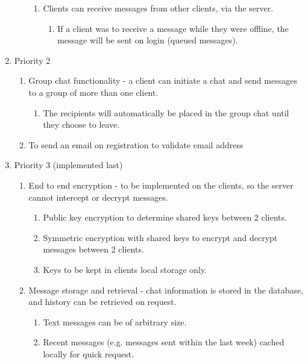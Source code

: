 \begin{enumerate}
\begin{enumerate}[label*=\arabic*.]
\begin{enumerate}[label*=\arabic*.]
\item Clients can receive messages from other clients, via the server. 
\begin{enumerate}[label*=\arabic*.]
\item If a client was to receive a message while they were offline, the message will be sent on login (queued messages).
\end{enumerate}
\end{enumerate}
\end{enumerate}
\item Priority 2
\begin{enumerate}[label*=\arabic*.]
\item  Group chat functionality - a client can initiate a chat and send messages to a group of more than one client.
\begin{enumerate}[label*=\arabic*.]
\item The recipients will automatically be placed in the group chat until they choose to leave.
\end{enumerate}
\item To send an email on registration to validate email address
\end{enumerate}
\item Priority 3 (implemented last)
\begin{enumerate}[label*=\arabic*.]
\item End to end encryption - to be implemented on the clients, so the server cannot intercept or decrypt messages.
\begin{enumerate}[label*=\arabic*.]
\item Public key encryption to determine shared keys between 2 clients.
\item Symmetric encryption with shared keys to encrypt and decrypt messages between 2 clients.
\item Keys to be kept in clients local storage only.
\end{enumerate}
\item Message storage and retrieval - chat information is stored in the database, and history can be retrieved on request.
\begin{enumerate}[label*=\arabic*.]
\item Text messages can be of arbitrary size.
\item Recent messages (e.g. messages sent within the last week) cached locally for quick request.
\end{enumerate}


\end{enumerate}
\end{enumerate}
